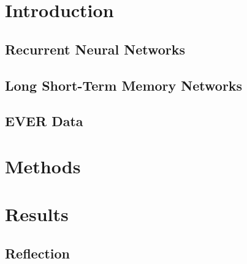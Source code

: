 \documentclass[12pt]{article}
\begin{document}


\tableofcontents
\newpage


\section{Introduction}\label{sec:intro}

\subsection{Recurrent Neural Networks}
 
\subsection{Long Short-Term Memory Networks}

\subsection{EVER Data}\label{sec:EVER}

%
\section{Methods}\label{sec:methods}

%
\section{Results}\label{sec:results}

\subsection{Reflection}



\newpage



\end{document}
